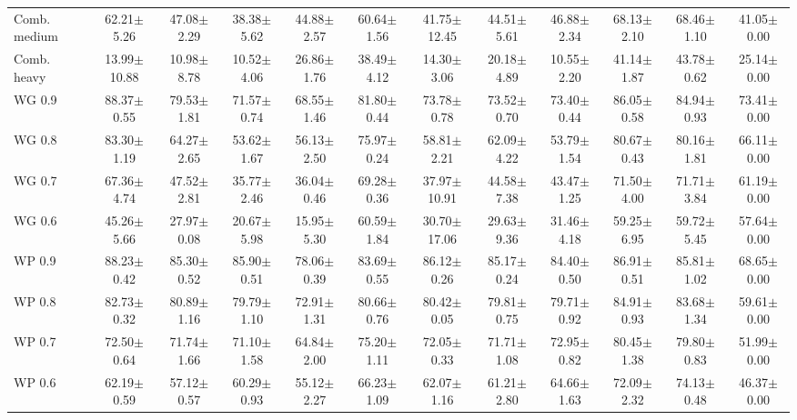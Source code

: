 \begin{table}[!t]
{\begin{tabular}{lccccccccccc}
Comb. medium & 62.21$\pm$5.26 & 47.08$\pm$2.29 & 38.38$\pm$5.62 & 44.88$\pm$2.57 & 60.64$\pm$1.56 & 41.75$\pm$12.45 & 44.51$\pm$5.61 & 46.88$\pm$2.34 & 68.13$\pm$2.10 & 68.46$\pm$1.10 & 41.05$\pm$0.00 \\
Comb. heavy & 13.99$\pm$10.88 & 10.98$\pm$8.78 & 10.52$\pm$4.06 & 26.86$\pm$1.76 & 38.49$\pm$4.12 & 14.30$\pm$3.06 & 20.18$\pm$4.89 & 10.55$\pm$2.20 & 41.14$\pm$1.87 & 43.78$\pm$0.62 & 25.14$\pm$0.00 \\
WG 0.9 & 88.37$\pm$0.55 & 79.53$\pm$1.81 & 71.57$\pm$0.74 & 68.55$\pm$1.46 & 81.80$\pm$0.44 & 73.78$\pm$0.78 & 73.52$\pm$0.70 & 73.40$\pm$0.44 & 86.05$\pm$0.58 & 84.94$\pm$0.93 & 73.41$\pm$0.00 \\
WG 0.8 & 83.30$\pm$1.19 & 64.27$\pm$2.65 & 53.62$\pm$1.67 & 56.13$\pm$2.50 & 75.97$\pm$0.24 & 58.81$\pm$2.21 & 62.09$\pm$4.22 & 53.79$\pm$1.54 & 80.67$\pm$0.43 & 80.16$\pm$1.81 & 66.11$\pm$0.00 \\
WG 0.7 & 67.36$\pm$4.74 & 47.52$\pm$2.81 & 35.77$\pm$2.46 & 36.04$\pm$0.46 & 69.28$\pm$0.36 & 37.97$\pm$10.91 & 44.58$\pm$7.38 & 43.47$\pm$1.25 & 71.50$\pm$4.00 & 71.71$\pm$3.84 & 61.19$\pm$0.00 \\
WG 0.6 & 45.26$\pm$5.66 & 27.97$\pm$0.08 & 20.67$\pm$5.98 & 15.95$\pm$5.30 & 60.59$\pm$1.84 & 30.70$\pm$17.06 & 29.63$\pm$9.36 & 31.46$\pm$4.18 & 59.25$\pm$6.95 & 59.72$\pm$5.45 & 57.64$\pm$0.00 \\
WP 0.9 & 88.23$\pm$0.42 & 85.30$\pm$0.52 & 85.90$\pm$0.51 & 78.06$\pm$0.39 & 83.69$\pm$0.55 & 86.12$\pm$0.26 & 85.17$\pm$0.24 & 84.40$\pm$0.50 & 86.91$\pm$0.51 & 85.81$\pm$1.02 & 68.65$\pm$0.00 \\
WP 0.8 & 82.73$\pm$0.32 & 80.89$\pm$1.16 & 79.79$\pm$1.10 & 72.91$\pm$1.31 & 80.66$\pm$0.76 & 80.42$\pm$0.05 & 79.81$\pm$0.75 & 79.71$\pm$0.92 & 84.91$\pm$0.93 & 83.68$\pm$1.34 & 59.61$\pm$0.00 \\
WP 0.7 & 72.50$\pm$0.64 & 71.74$\pm$1.66 & 71.10$\pm$1.58 & 64.84$\pm$2.00 & 75.20$\pm$1.11 & 72.05$\pm$0.33 & 71.71$\pm$1.08 & 72.95$\pm$0.82 & 80.45$\pm$1.38 & 79.80$\pm$0.83 & 51.99$\pm$0.00 \\
WP 0.6 & 62.19$\pm$0.59 & 57.12$\pm$0.57 & 60.29$\pm$0.93 & 55.12$\pm$2.27 & 66.23$\pm$1.09 & 62.07$\pm$1.16 & 61.21$\pm$2.80 & 64.66$\pm$1.63 & 72.09$\pm$2.32 & 74.13$\pm$0.48 & 46.37$\pm$0.00 \\
\hline
\end{tabular}}
\end{table}
